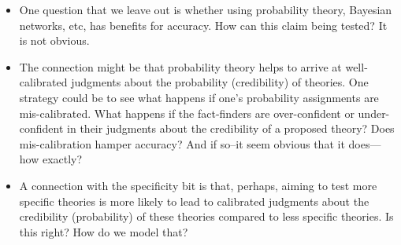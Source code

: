 \documentclass[
  11pt,
  dvipsnames,enabledeprecatedfontcommands]{scrartcl}
\begin{document}
\begin{itemize}
\item
  One question that we leave out is whether using probability theory,
  Bayesian networks, etc, has benefits for accuracy. How can this claim
  being tested? It is not obvious.
\item
  The connection might be that probability theory helps to arrive at
  well-calibrated judgments about the probability (credibility) of
  theories. One strategy could be to see what happens if one's
  probability assignments are mis-calibrated. What happens if the
  fact-finders are over-confident or under-confident in their judgments
  about the credibility of a proposed theory? Does mis-calibration
  hamper accuracy? And if so--it seem obvious that it does---how
  exactly?
\item
  A connection with the specificity bit is that, perhaps, aiming to test
  more specific theories is more likely to lead to calibrated judgments
  about the credibility (probability) of these theories compared to less
  specific theories. Is this right? How do we model that?
\end{itemize}
\end{document}
